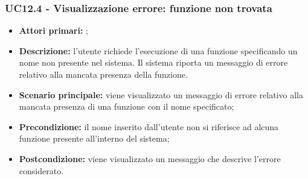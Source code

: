 \subsubsection{UC12.4 - Visualizzazione errore: funzione non trovata}
\begin{itemize}
	\item \textbf{Attori primari:} \ua{};
	\item \textbf{Descrizione:}  l’utente richiede l’esecuzione di una funzione specificando un nome non presente nel sistema. Il sistema riporta un messaggio di errore relativo alla mancata presenza della funzione.
	\item \textbf{Scenario principale:} viene visualizzato un messaggio di errore relativo alla mancata presenza di una funzione con il nome specificato; 
	\item \textbf{Precondizione:} il nome inserito dall’utente non si riferisce ad alcuna funzione presente all’interno del sistema;  
	\item \textbf{Postcondizione:} viene visualizzato un messaggio che descrive l’errore considerato. 
\end{itemize}